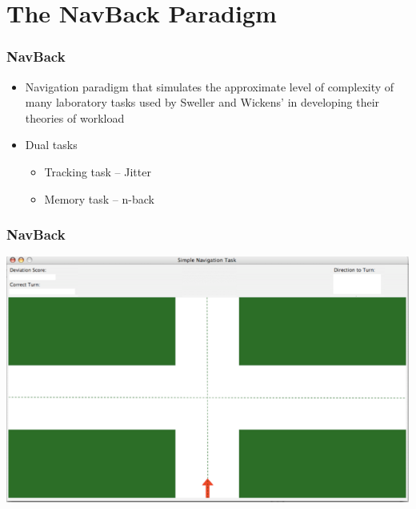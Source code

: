 \documentclass{beamer}
\begin{document}

\section{The NavBack Paradigm}

\begin{frame}
	\frametitle{NavBack}
	\begin{itemize}
		\item Navigation paradigm that simulates the approximate level of complexity of many laboratory tasks used by Sweller and Wickens' in developing their theories of workload
		\item Dual tasks
		\begin{itemize}
			\item Tracking task -- Jitter
			\item Memory task -- n-back
		\end{itemize}
	\end{itemize}
\end{frame}

\begin{frame} 
	\frametitle{NavBack}
	\begin{center}
		\includegraphics[width=.75\textwidth]{../zNvBkFigs/NavBack}
	\end{center}


\end{frame}
\end{document}
